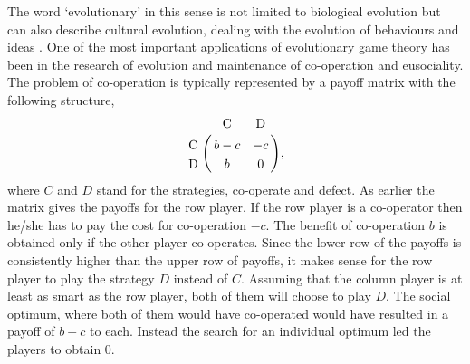\documentclass[oneside,11pt,a4paper]{book}
\begin{document}
The word `evolutionary' in this sense is not limited to biological evolution but can also describe cultural evolution, dealing with the evolution of behaviours and ideas \citep{hofbauer:1998mm,vincent:2003bo,kandori:1993aa}.
One of the most important applications of evolutionary game theory has been in the research of evolution and maintenance of co-operation and eusociality.
The problem of co-operation is typically represented by a payoff matrix with the following structure,
%
\begin{eqnarray}
\bordermatrix{
 & \text{C} & \text{D} \cr
\text{C} & b-c & -c \cr
\text{D} & b & 0 \cr},
\label{coop:FitnessMatrix}
\end{eqnarray}
%
where $C$ and $D$ stand for the strategies, co-operate and defect.
As earlier the matrix gives the payoffs for the row player.
If the row player is a co-operator then he/she has to pay the cost for co-operation $-c$.
The benefit of co-operation $b$ is obtained only if the other player co-operates.
Since the lower row of the payoffs is consistently higher than the upper row of payoffs, it makes sense for the row player to play the strategy $D$ instead of $C$.
Assuming that the column player is at least as smart as the row player, both of them will choose to play $D$.
The social optimum, where both of them would have co-operated would have resulted in a payoff of $b-c$ to each.
Instead the search for an individual optimum led the players to obtain $0$.
\end{document}
